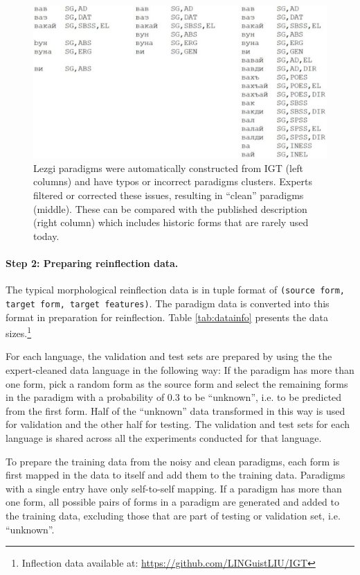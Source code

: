 \begin{figure}
    \centering
    \includegraphics[width=13cm]{figs/IGT2P-paradigms.pdf}
    \caption[Noisy to Clean Paradigms]{Lezgi paradigms were automatically constructed from IGT (left columns) and have typos or incorrect paradigms clusters. Experts filtered or corrected these issues, resulting in ``clean'' paradigms (middle). These can be compared with the published description (right column) which includes historic forms that are rarely used today.}
    \label{fig:cleaning}
\end{figure}

\paragraph{Step 2: Preparing reinflection data.}
The typical morphological reinflection data is in tuple format of \texttt{(source form, target form, target features)}. The paradigm data is converted into this format in preparation for reinflection. Table \ref{tab:datainfo} presents the data sizes.\footnote{Inflection data available at: \url{https://github.com/LINGuistLIU/IGT}} 

For each language, the validation and test sets are prepared by using the the expert-cleaned data language in the following way: If the paradigm has more than one form, pick a random form as the source form and select the remaining forms in the paradigm with a probability of 0.3 to be ``unknown'', i.e. to be predicted from the first form. Half of the ``unknown'' data transformed in this way is used for validation and the other half for testing. The validation and test sets for each language is shared across all the experiments conducted for that language.

To prepare the training data from the noisy and clean paradigms, each form is first mapped in the data to itself and add them to the training data. Paradigms with a single entry have only self-to-self mapping. If a paradigm has more than one form, all possible pairs of forms in a paradigm are generated and added to the training data, excluding those that are part of testing or validation set, i.e. ``unknown''.
 

